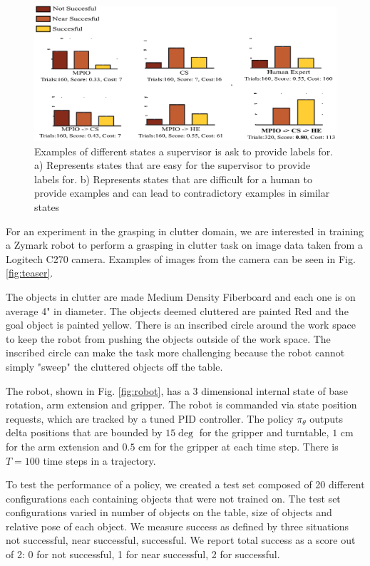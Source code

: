 \documentclass[10pt, conference]{ieeeconf}      %
\begin{document}
\begin{figure}[t]
\centering

\includegraphics{f_figs/results.eps}

\caption{\footnotesize  Examples of different states a supervisor is ask to provide labels for. a) Represents states that are easy for the supervisor to provide labels for.  b) Represents states that are difficult for a human to provide examples and can lead to contradictory examples in similar states }
\vspace*{-20pt}
\label{fig:perf_results}
\end{figure}

For an experiment in the grasping in clutter domain, we are interested in training a Zymark robot to perform a grasping in clutter task on image data taken from a Logitech C270 camera. Examples of images from the camera can be seen in Fig. \ref{fig:teaser}.

The objects in clutter are made Medium Density Fiberboard and each one is on average 4" in diameter. The objects deemed cluttered are painted Red and the goal object is painted yellow. There is an inscribed circle around the work space to keep the robot from pushing the objects outside of the work space. The inscribed circle can make the task more challenging because the robot cannot simply "sweep" the cluttered objects off the table. 

The robot, shown in Fig. \ref{fig:robot}, has a 3 dimensional internal state of base rotation, arm extension and gripper. The robot is commanded via state position requests, which are tracked by a tuned PID controller. The policy $\pi_\theta$ outputs delta positions that are bounded by $15\deg$ for the gripper and turntable, $1$ cm for the arm extension and $0.5$ cm for the gripper at each time step. There is $T=100$ time steps in a trajectory. 

To test the performance of a policy, we created a test set composed of 20 different configurations each containing objects that were not trained on.  The test set configurations varied in number of objects on the table, size of objects and relative pose of each object. We measure success as defined by three situations not successful, near successful, successful. We report total success as a score out of 2: 0 for not successful, 1 for near successful, 2 for successful.
\end{document}
